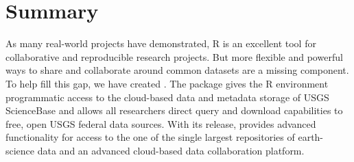 \section{Summary}

As many real-world projects have demonstrated, R is 
an excellent tool for collaborative and reproducible 
research projects. But more flexible and powerful
ways to share and collaborate around common datasets
are a missing component. To help fill this gap, we 
have created . The  package
gives the R environment programmatic access to the 
cloud-based data and metadata storage of USGS ScienceBase 
and allows all researchers direct query and download 
capabilities to free, open USGS federal data sources. 
With its release,  provides advanced
functionality for access to the one of the single 
largest repositories of earth-science data and an advanced 
cloud-based data collaboration platform.

